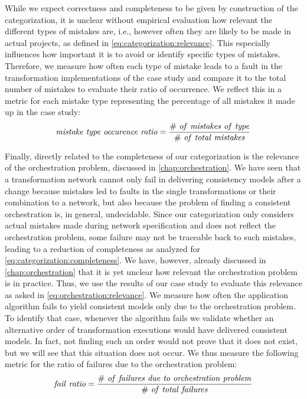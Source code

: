 While we expect correctness and completeness to be given by construction of the categorization, it is unclear without empirical evaluation how relevant the different types of mistakes are, i.e., however often they are likely to be made in actual projects, as defined in \autoref{eq:categorization:relevance}.
This especially influences how important it is to avoid or identify specific types of mistakes.
Therefore, we measure how often each type of mistake leads to a fault in the transformation implementations of the case study and compare it to the total number of mistakes to evaluate their ratio of occurrence.
We reflect this in a metric for each mistake type representing the percentage of all mistakes it made up in the case study:
\begin{align*}
    \mathvariable{mistake\ type\ occurence\ ratio} = \frac{\mathvariable{\#\ of\ mistakes\ of\ type}}{\mathvariable{\#\ of\ total\ mistakes}}
\end{align*}

Finally, directly related to the completeness of our categorization is the relevance of the orchestration problem, discussed in \autoref{chap:orchestration}.
We have seen that a transformation network cannot only fail in delivering consistency models after a change because mistakes led to faults in the single transformations or their combination to a network, but also because the problem of finding a consistent orchestration is, in general, undecidable.
Since our categorization only considers actual mistakes made during network specification and does not reflect the orchestration problem, some failure may not be traceable back to such mistakes, leading to a reduction of completeness as analyzed for \autoref{eq:categorization:completeness}.
We have, however, already discussed in \autoref{chap:orchestration} that it is yet unclear how relevant the orchestration problem is in practice.
Thus, we use the results of our case study to evaluate this relevance as asked in \autoref{eq:orchestration:relevance}.
We measure how often the application algorithm fails to yield consistent models only due to the orchestration problem.
To identify that case, whenever the algorithm fails we validate whether an alternative order of transformation executions would have delivered consistent models.
In fact, not finding such an order would not prove that it does not exist, but we will see that this situation does not occur.
We thus measure the following metric for the ratio of failures due to the orchestration problem:
\begin{align*}
    \mathvariable{fail\ ratio} = \frac{\mathvariable{\#\ of\ failures\ due\ to\ orchestration\ problem}}{\mathvariable{\#\ of\ total\ failures}}
\end{align*}


